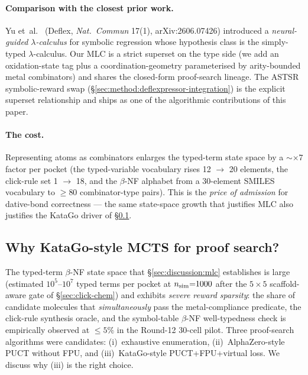 \paragraph{Comparison with the closest prior work.}
Yu et~al.~\cite{yu2026deflex} (Deflex, \emph{Nat.\ Commun} 17(1),
arXiv:2606.07426) introduced a \emph{neural-guided $\lambda$-calculus}
for symbolic regression whose hypothesis class is the simply-typed
$\lambda$-calculus. Our MLC is a strict superset on the type side
(we add an oxidation-state tag plus a coordination-geometry
parameterised by arity-bounded metal combinators) and shares the
closed-form proof-search lineage. The ASTSR symbolic-reward swap
(\S\ref{sec:method:deflexpressor-integration}) is the explicit
superset relationship and ships as one of the algorithmic
contributions of this paper.

\paragraph{The cost.}
Representing atoms as combinators enlarges the typed-term state
space by a $\sim \times 7$ factor per pocket (the typed-variable
vocabulary rises 12 $\to$ 20 elements, the click-rule set
1 $\to$ 18, and the $\beta$-NF alphabet from a 30-element SMILES
vocabulary to $\geq 80$ combinator-type pairs). This is the
\emph{price of admission} for dative-bond correctness --- the same
state-space growth that justifies MLC also justifies the KataGo
driver of \S\ref{sec:discussion:katago}.


\subsection{Why KataGo-style MCTS for proof search?}
\label{sec:discussion:katago}

The typed-term $\beta$-NF state space that
\S\ref{sec:discussion:mlc} establishes is large (estimated
$10^{5}$--$10^{7}$ typed terms per pocket at $n_{\rm sim}{=}1000$
after the $5{\times}5$ scaffold-aware gate of \S\ref{sec:click-chem})
and exhibits \emph{severe reward sparsity}: the share of candidate
molecules that \emph{simultaneously} pass the metal-compliance
predicate, the click-rule synthesis oracle, and the symbol-table
$\beta$-NF well-typedness check is empirically observed at
$\leq 5\%$ in the Round-12 30-cell pilot. Three proof-search
algorithms were candidates: (i)~exhaustive enumeration,
(ii)~AlphaZero-style PUCT without FPU, and
(iii)~KataGo-style PUCT+FPU+virtual loss. We discuss why (iii) is
the right choice.

